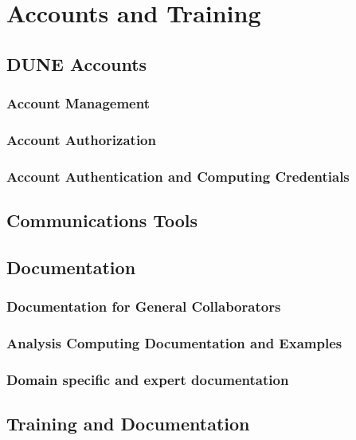 %
\chapter{Accounts and Training} 
\section{DUNE Accounts}
\subsection{Account Management}
\subsection{Account Authorization}
\subsection{Account Authentication and Computing Credentials}
\section{Communications Tools}
\section{Documentation}
\subsection{Documentation for General Collaborators}
\subsection{Analysis Computing Documentation and Examples}
\subsection{Domain specific and expert documentation}
\section{Training and Documentation}

